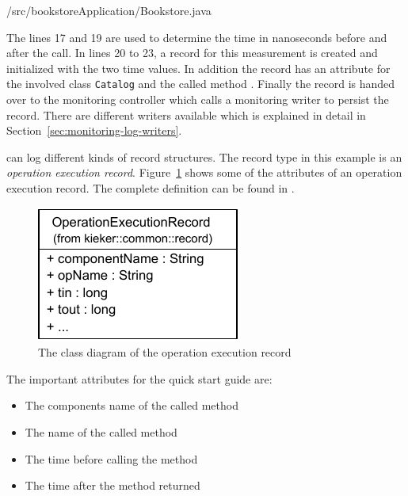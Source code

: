 \setJavaCodeListing
%
{\manualInstrumentedBookstoreApplicationDir/src/bookstoreApplication/Bookstore.java}
 
\noindent The lines 17 and 19 are used to determine the time in nanoseconds before and after the  call. In lines 20 to 23, a record for this measurement is created and initialized with the two time values. In addition the record has an attribute for the involved class \verb!Catalog! and the called method . Finally the record is handed over to the monitoring controller which calls a monitoring writer to persist the record. There are different writers available which is explained in detail in Section~\ref{sec:monitoring-log-writers}.

\Kieker{} can log different kinds of record structures. The record type in this example is an \textit{operation execution record}. Figure~\ref{fig:OperationExecutionRecordClassDiagram} shows some of the attributes of an operation execution record. The complete definition can be found in .

\begin{figure}[H]
\begin{centering}
\includegraphics[scale=1]{images/kieker_OperationExecutionRecord-notraceattributes}%
\caption{The class diagram of the operation execution record}
\label{fig:OperationExecutionRecordClassDiagram}
\end{centering}
\end{figure}

\noindent The important attributes for the quick start guide are:

\begin{itemize}
\item[\hskip1em\class{componentName:}] The components name of the called method
\item[\hskip1em\class{opName:}] The name of the called method
\item[\hskip1em\class{tin:}] The time before calling the method
\item[\hskip1em\class{tout:}] The time after the method returned
\end{itemize}


